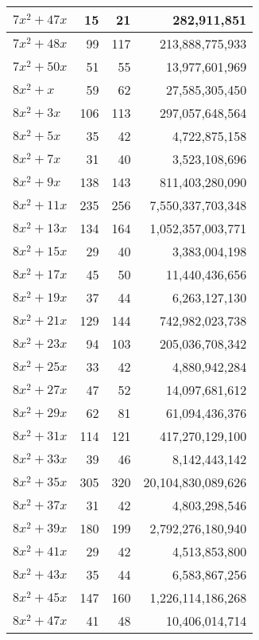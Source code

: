\documentclass[a4paper]{amsproc}
\theoremstyle{plain}
\begin{document}
\begin{longtable}{ | l | r | r | r | }
$7x^2 + 47x$ & 15 & 21 & 282{,}911{,}851 \\ \hline
$7x^2 + 48x$ & 99 & 117 & 213{,}888{,}775{,}933 \\ \hline
$7x^2 + 50x$ & 51 & 55 & 13{,}977{,}601{,}969 \\ \hline
$8x^2 + x$ & 59 & 62 & 27{,}585{,}305{,}450 \\ \hline
$8x^2 + 3x$ & 106 & 113 & 297{,}057{,}648{,}564 \\ \hline
$8x^2 + 5x$ & 35 & 42 & 4{,}722{,}875{,}158 \\ \hline
$8x^2 + 7x$ & 31 & 40 & 3{,}523{,}108{,}696 \\ \hline
$8x^2 + 9x$ & 138 & 143 & 811{,}403{,}280{,}090 \\ \hline
$8x^2 + 11x$ & 235 & 256 & 7{,}550{,}337{,}703{,}348 \\ \hline
$8x^2 + 13x$ & 134 & 164 & 1{,}052{,}357{,}003{,}771 \\ \hline
$8x^2 + 15x$ & 29 & 40 & 3{,}383{,}004{,}198 \\ \hline
$8x^2 + 17x$ & 45 & 50 & 11{,}440{,}436{,}656 \\ \hline
$8x^2 + 19x$ & 37 & 44 & 6{,}263{,}127{,}130 \\ \hline
$8x^2 + 21x$ & 129 & 144 & 742{,}982{,}023{,}738 \\ \hline
$8x^2 + 23x$ & 94 & 103 & 205{,}036{,}708{,}342 \\ \hline
$8x^2 + 25x$ & 33 & 42 & 4{,}880{,}942{,}284 \\ \hline
$8x^2 + 27x$ & 47 & 52 & 14{,}097{,}681{,}612 \\ \hline
$8x^2 + 29x$ & 62 & 81 & 61{,}094{,}436{,}376 \\ \hline
$8x^2 + 31x$ & 114 & 121 & 417{,}270{,}129{,}100 \\ \hline
$8x^2 + 33x$ & 39 & 46 & 8{,}142{,}443{,}142 \\ \hline
$8x^2 + 35x$ & 305 & 320 & 20{,}104{,}830{,}089{,}626 \\ \hline
$8x^2 + 37x$ & 31 & 42 & 4{,}803{,}298{,}546 \\ \hline
$8x^2 + 39x$ & 180 & 199 & 2{,}792{,}276{,}180{,}940 \\ \hline
$8x^2 + 41x$ & 29 & 42 & 4{,}513{,}853{,}800 \\ \hline
$8x^2 + 43x$ & 35 & 44 & 6{,}583{,}867{,}256 \\ \hline
$8x^2 + 45x$ & 147 & 160 & 1{,}226{,}114{,}186{,}268 \\ \hline
$8x^2 + 47x$ & 41 & 48 & 10{,}406{,}014{,}714 \\ \hline

\end{longtable}
\end{document}
